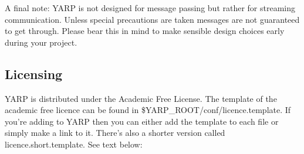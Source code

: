 A final note: YARP is not designed for message passing but rather for streaming communication. Unless special precautions are taken messages are not guaranteed to get through. Please bear this in mind to make sensible design choices early during your project.

\subsection{Licensing}
YARP is distributed under the Academic Free License. The template of the academic
free licence can be found in \$YARP\_ROOT/conf/licence.template. If you're adding to YARP then you can either add the template to each file or simply make a link to it. There's also a shorter version called licence.short.template. See text below:

